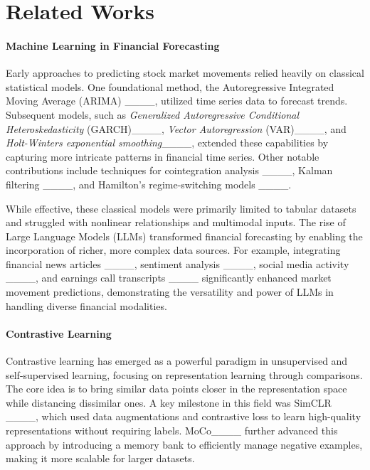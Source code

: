 \section{Related Works}
\label{sec:preliminaries}

\paragraph{Machine Learning in Financial Forecasting}
Early approaches to predicting stock market movements relied heavily on classical statistical models. One foundational method, the Autoregressive Integrated Moving Average (ARIMA) ____, utilized time series data to forecast trends. Subsequent models, such as \textit{Generalized Autoregressive Conditional Heteroskedasticity} (GARCH)____, \textit{Vector Autoregression} (VAR)____, and \textit{Holt-Winters exponential smoothing}____, extended these capabilities by capturing more intricate patterns in financial time series. Other notable contributions include techniques for cointegration analysis ____, Kalman filtering ____, and Hamilton’s regime-switching models ____.

While effective, these classical models were primarily limited to tabular datasets and struggled with nonlinear relationships and multimodal inputs. The rise of Large Language Models (LLMs) transformed financial forecasting by enabling the incorporation of richer, more complex data sources. For example, integrating financial news articles ____, sentiment analysis ____, social media activity ____, and earnings call transcripts ____ significantly enhanced market movement predictions, demonstrating the versatility and power of LLMs in handling diverse financial modalities.

\paragraph{Contrastive Learning} 
Contrastive learning has emerged as a powerful paradigm in unsupervised and self-supervised learning, focusing on representation learning through comparisons. The core idea is to bring similar data points closer in the representation space while distancing dissimilar ones. A key milestone in this field was SimCLR ____, which used data augmentations and contrastive loss to learn high-quality representations without requiring labels. MoCo____ further advanced this approach by introducing a memory bank to efficiently manage negative examples, making it more scalable for larger datasets.


